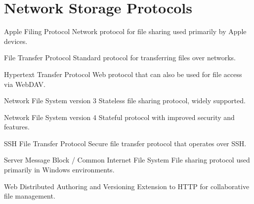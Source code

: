 \documentclass[letterpaper,10pt,english]{sphinxmanual}
\begin{document}
\chapter{Network Storage Protocols}
\label{\detokenize{glossary:network-storage-protocols}}\begin{description}
\sphinxAtStartPar
Apple Filing Protocol \sphinxhyphen{} Network protocol for file sharing used primarily by Apple devices.

\sphinxAtStartPar
File Transfer Protocol \sphinxhyphen{} Standard protocol for transferring files over networks.

\sphinxAtStartPar
Hypertext Transfer Protocol \sphinxhyphen{} Web protocol that can also be used for file access via WebDAV.

\sphinxAtStartPar
Network File System version 3 \sphinxhyphen{} Stateless file sharing protocol, widely supported.

\sphinxAtStartPar
Network File System version 4 \sphinxhyphen{} Stateful protocol with improved security and features.

\sphinxAtStartPar
SSH File Transfer Protocol \sphinxhyphen{} Secure file transfer protocol that operates over SSH.

\sphinxAtStartPar
Server Message Block / Common Internet File System \sphinxhyphen{} File sharing protocol used primarily in Windows environments.

\sphinxAtStartPar
Web Distributed Authoring and Versioning \sphinxhyphen{} Extension to HTTP for collaborative file management.

\end{description}
\end{document}
